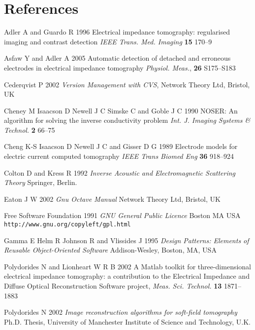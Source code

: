 \documentclass[12pt]{iopart}
\begin{document}
\section*{References}
\begin{thebibliography}{99}

Adler A and Guardo R
1996
Electrical impedance tomography: regularised imaging and contrast detection 
\textit{IEEE Trans. Med. Imaging} \textbf{15} 170--9

Asfaw Y and Adler A
 2005
Automatic detection of detached and erroneous electrodes in electrical impedance tomography
{\it Physiol. Meas.}, {\bf 26} S175--S183

Cederqvist P 2002
{\it Version Management with CVS},
Network Theory Ltd, Bristol, UK

Cheney M
Isaacson D
Newell J C
Simske C and
Goble J C 1990
NOSER: An algorithm for solving the inverse conductivity problem
\textit{Int. J. Imaging Systems \& Technol.} \textbf{2} 66--75


Cheng K-S
Isaacson D
Newell J C and
Gisser D G
1989
Electrode models for electric current
computed tomography
{\it IEEE Trans Biomed Eng}
{\bf 36} 918--924

Colton D and Kress R 1992
{\it Inverse Acoustic and Electromagnetic Scattering Theory}
Springer, Berlin.


Eaton J W 2002
{\it Gnu Octave Manual}
Network Theory Ltd, Bristol, UK

Free Software Foundation 1991
{\it GNU General Public Licence}
Boston MA USA
{\tt http://www.gnu.org/copyleft/gpl.html}

Gamma E Helm R Johnson R and Vlissides J 1995
{\it Design Patterns: Elements of Reusable Object-Oriented Software}
Addison-Wesley, Boston, MA, USA

Polydorides N and Lionheart W R B
2002
A Matlab toolkit for three-dimensional electrical impedance
tomography: a contribution to the Electrical Impedance and
Diffuse Optical Reconstruction Software project,
{\it Meas. Sci. Technol.} {\bf 13} 1871--1883 

Polydorides N 
2002
{\it Image reconstruction algorithms for soft-field tomography}
Ph.D. Thesis,
University of Manchester Institute of Science and Technology, U.K. 


\end{thebibliography}
\end{document}
